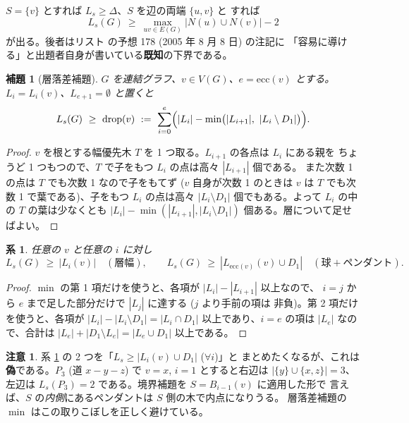 \documentclass[paper=a4,fontsize=10.5pt,jafontsize=10.5pt]{jlreq}
\theoremstyle{plain}
\newtheorem{lemma}[theorem]{補題}
\newtheorem{corollary}[theorem]{系}
\theoremstyle{definition}
\newtheorem{remark}[theorem]{注意}
\begin{document}
$S = \{v\}$ とすれば $L_s \ge \Delta$、$S$ を辺の両端 $\{u,v\}$ と
すれば
\[ L_s(G) \ \ge \ \max_{uv \in E(G)} |N(u) \cup N(v)| - 2 \]
が出る。後者はリスト \cite{wowii} の予想 178 (2005 年 8 月 8 日) の注記に
「容易に導ける」と出題者自身が書いている\textbf{既知}の下界である。

\begin{lemma}[層落差補題]\label{lem:drop}
$G$ を連結グラフ、$v \in V(G)$、$e = \mathrm{ecc}(v)$ とする。
$L_i = L_i(v)$、$L_{e+1} = \emptyset$ と置くと
\[ L_s(G) \ \ge \ \mathrm{drop}(v) \ := \
   \sum_{i=0}^{e} \Bigl( |L_i| - \min\bigl(|L_{i+1}|,\
   |L_i \setminus D_1|\bigr) \Bigr) . \]
\end{lemma}

\begin{proof}
$v$ を根とする幅優先木 $T$ を 1 つ取る。$L_{i+1}$ の各点は $L_i$ にある親を
ちょうど 1 つもつので、$T$ で子をもつ $L_i$ の点は高々 $|L_{i+1}|$ 個である。
また次数 1 の点は $T$ でも次数 1 なので子をもてず ($v$ 自身が次数 1 のときは
$v$ は $T$ でも次数 1 で葉である)、子をもつ $L_i$ の点は高々
$|L_i \setminus D_1|$ 個でもある。よって $L_i$ の中の $T$ の葉は少なくとも
$|L_i| - \min(|L_{i+1}|, |L_i \setminus D_1|)$ 個ある。層について足せばよい。
\end{proof}

\begin{corollary}\label{cor:drop}
任意の $v$ と任意の $i$ に対し
\[ L_s(G) \ \ge \ |L_i(v)| \quad (\text{層幅}), \qquad
   L_s(G) \ \ge \ |L_{\mathrm{ecc}(v)}(v) \cup D_1| \quad
   (\text{球} + \text{ペンダント}) . \]
\end{corollary}

\begin{proof}
$\min$ の第 1 項だけを使うと、各項が $|L_i| - |L_{i+1}|$ 以上なので、
$i = j$ から $e$ まで足した部分だけで $|L_j|$ に達する ($j$ より手前の項は
非負)。第 2 項だけを使うと、各項が $|L_i| - |L_i \setminus D_1| =
|L_i \cap D_1|$ 以上であり、$i = e$ の項は $|L_e|$ なので、合計は
$|L_e| + |D_1 \setminus L_e| = |L_e \cup D_1|$ 以上である。
\end{proof}

\begin{remark}
系 \ref{cor:drop} の 2 つを「$L_s \ge |L_i(v) \cup D_1|$ ($\forall i$)」と
まとめたくなるが、これは\textbf{偽}である。$P_3$ (道 $x - y - z$) で
$v = x$, $i = 1$ とすると右辺は $|\{y\} \cup \{x,z\}| = 3$、
左辺は $L_s(P_3) = 2$ である。境界補題を $S = B_{i-1}(v)$ に適用した形で
言えば、$S$ の\emph{内側}にあるペンダントは $S$ 側の木で内点になりうる。
層落差補題の $\min$ はこの取りこぼしを正しく避けている。
\end{remark}
\end{document}
